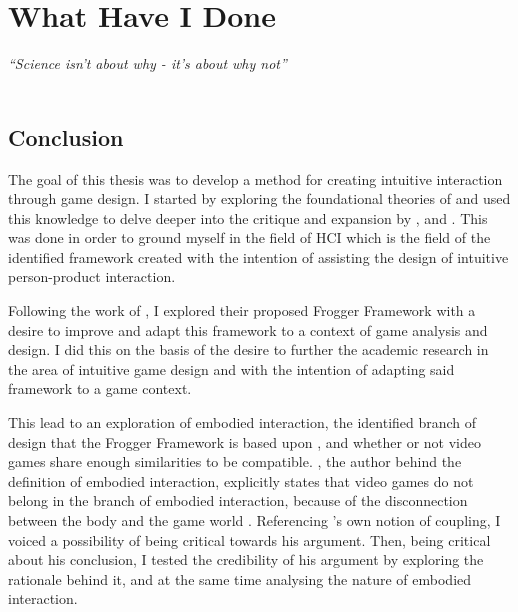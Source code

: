 \chapter{What Have I Done}
\textit{``Science isn't about why - it's about why not''} \\
 \\

\section{Conclusion}
The goal of this thesis was to develop a method for creating intuitive interaction through game design. I started by exploring the foundational theories of  and used this knowledge to delve deeper into the critique and expansion by ,  and . This was done in order to ground myself in the field of HCI which is the field of the identified framework created with the intention of assisting the design of intuitive person-product interaction.

Following the work of , I explored their proposed Frogger Framework with a desire to improve and adapt this framework to a context of game analysis and design. I did this on the basis of the desire to further the academic research in the area of intuitive game design and with the intention of adapting said framework to a game context.

This lead to an exploration of embodied interaction, the identified branch of design that the Frogger Framework is based upon \cite{frogger}, and whether or not video games share enough similarities to be compatible. , the author behind the definition of embodied interaction, explicitly states that video games do not belong in the branch of embodied interaction, because of the disconnection between the body and the game world \cite{dourish}. Referencing \citeauthor{dourish}'s \citeyear{dourish} own notion of coupling, I voiced a possibility of being critical towards his argument. Then, being critical about his conclusion, I tested the credibility of his argument by exploring the rationale behind it, and at the same time analysing the nature of embodied interaction.

